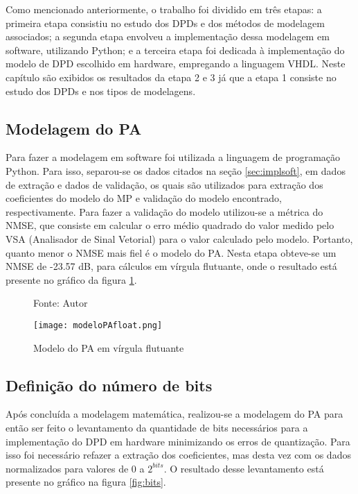 Como mencionado anteriormente, o trabalho foi dividido em três etapas: a primeira etapa consistiu no estudo dos DPDs e dos métodos de modelagem associados; a segunda etapa envolveu a implementação dessa modelagem em software, utilizando Python; e a terceira etapa foi dedicada à implementação do modelo de DPD escolhido em hardware, empregando a linguagem VHDL.
Neste capítulo são exibidos os resultados da etapa 2 e 3 já que a etapa 1 consiste no estudo dos DPDs e nos tipos de modelagens.

\subsection{Modelagem do PA}

Para fazer a modelagem em software foi utilizada a linguagem de programação Python. Para isso, separou-se os dados citados na seção \ref{sec:implsoft}, em dados de extração e dados de validação, os quais são utilizados para extração dos coeficientes do modelo do MP e validação do modelo encontrado, respectivamente. Para fazer a validação do modelo utilizou-se a métrica do NMSE, que consiste em calcular o erro médio quadrado do valor medido pelo VSA (Analisador de Sinal Vetorial) para o valor calculado pelo modelo. Portanto, quanto menor o NMSE mais fiel é o modelo do PA. Nesta etapa obteve-se um NMSE de -23.57 dB, para cálculos em vírgula flutuante, onde o resultado está presente no gráfico da figura \ref{fig:modelopafloat}.

\begin{figure}[H]
    \centering
    \captionsetup{justification=centering}
    \caption*{Fonte: Autor}
    \texttt{[image: modeloPAfloat.png]}
    \caption{Modelo do PA em vírgula flutuante}
    \label{fig:modelopafloat}
\end{figure}

\subsection{Definição do número de bits}

Após concluída a modelagem matemática, realizou-se a modelagem do PA para então ser feito o levantamento da quantidade de bits necessários para a implementação do DPD em hardware minimizando os erros de quantização. 
Para isso foi necessário refazer a extração dos coeficientes, mas desta vez com os dados normalizados para valores de 0 a $2^{bits}$.  
O resultado desse levantamento está presente no gráfico na figura \ref{fig:bits}.

